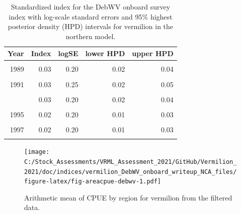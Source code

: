\documentclass[11pt,
  english,
]{article}
\begin{document}
\begin{table}

\caption{\label{tab:tab-index-debwv}Standardized index for the DebWV onboard survey index with log-scale standard errors and 95\% highest
       posterior density (HPD) intervals for vermilion in the northern model.}
\centering
\begin{tabular}[t]{rrrrr}
\toprule
Year & Index & logSE & lower HPD & upper HPD\\
\midrule
\cellcolor{gray!6}{1988} & \cellcolor{gray!6}{0.02} & \cellcolor{gray!6}{0.22} & \cellcolor{gray!6}{0.01} & \cellcolor{gray!6}{0.03}\\
1989 & 0.03 & 0.20 & 0.02 & 0.04\\
\cellcolor{gray!6}{1990} & \cellcolor{gray!6}{0.06} & \cellcolor{gray!6}{0.23} & \cellcolor{gray!6}{0.04} & \cellcolor{gray!6}{0.10}\\
1991 & 0.03 & 0.25 & 0.02 & 0.05\\
\cellcolor{gray!6}{1992} & \cellcolor{gray!6}{0.02} & \cellcolor{gray!6}{0.20} & \cellcolor{gray!6}{0.01} & \cellcolor{gray!6}{0.03}\\
\addlinespace
1993 & 0.03 & 0.20 & 0.02 & 0.04\\
\cellcolor{gray!6}{1994} & \cellcolor{gray!6}{0.02} & \cellcolor{gray!6}{0.20} & \cellcolor{gray!6}{0.01} & \cellcolor{gray!6}{0.03}\\
1995 & 0.02 & 0.20 & 0.01 & 0.03\\
\cellcolor{gray!6}{1996} & \cellcolor{gray!6}{0.02} & \cellcolor{gray!6}{0.20} & \cellcolor{gray!6}{0.01} & \cellcolor{gray!6}{0.02}\\
1997 & 0.02 & 0.20 & 0.01 & 0.03\\
\addlinespace
\cellcolor{gray!6}{1998} & \cellcolor{gray!6}{0.02} & \cellcolor{gray!6}{0.20} & \cellcolor{gray!6}{0.01} & \cellcolor{gray!6}{0.03}\\
\bottomrule
\end{tabular}
\end{table}

\FloatBarrier

\begin{figure}
\centering
\texttt{[image: C:/Stock\_Assessments/VRML\_Assessment\_2021/GitHub/Vermilion\_2021/doc/indices/vermilion\_DebWV\_onboard\_writeup\_NCA\_files/figure-latex/fig-areacpue-debwv-1.pdf]}
\caption{\label{fig:fig-areacpue-debwv}Arithmetic mean of CPUE by region for vermilion from the filtered data.}
\end{figure}
\end{document}
